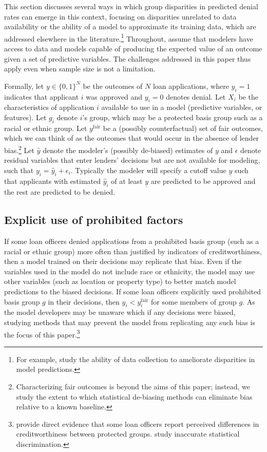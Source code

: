 This section discusses several ways in which group disparities in predicted denial rates can emerge in this context, focusing on disparities unrelated to data availability or the ability of a model to approximate its training data, which are addressed elsewhere in the literature.\footnote{For example,  study the ability of data collection to ameliorate disparities in model predictions.} Throughout, assume that modelers have access to data and models capable of producing the expected value of an outcome given a set of predictive variables. The challenges addressed in this paper thus apply even when sample size is not a limitation.

Formally, let $y\in\{0,1\}^N$ be the outcomes of $N$ loan applications, where $y_i=1$ indicates that applicant $i$ was approved and $y_i=0$ denotes denial. Let $X_i$ be the characteristics of application $i$ available to use in a model (predictive variables, or features). Let $g_i$ denote $i$'s group, which may be a protected basis group such as a racial or ethnic group. Let $y^\text{fair}$ be a (possibly counterfactual) set of fair outcomes, which we can think of as the outcomes that would occur in the absence of lender bias.\footnote{Characterizing fair outcomes is beyond the aims of this paper; instead, we study the extent to which statistical de-biasing methods can eliminate bias relative to a known baseline.} Let $\hat{y}$ denote the modeler's (possibly de-biased) estimates of $y$ and $\epsilon$ denote residual variables that enter lenders' decisions but are not available for modeling, such that $y_i = \hat{y}_i + \epsilon_i$. Typically the modeler will specify a cutoff value $\underline{y}$ such that applicants with estimated $\hat{y}_i$ of at least $\underline{y}$ are predicted to be approved and the rest are predicted to be denied. 

\subsection{Explicit use of prohibited factors}\label{sec:disparatetreatment}
If some loan officers denied applications from a prohibited basis group (such as a racial or ethnic group) more often than justified by indicators of creditworthiness, then a model trained on their decisions may replicate that bias. Even if the variables used in the model do not include race or ethnicity, the model may use other variables (such as location or property type) to better match model predictions to the biased decisions. If some loan officers explicitly used prohibited basis group $g$ in their decisions, then $y_i<y^\text{fair}_i$ for some members of group $g$. As the model developers may be unaware which if any decisions were biased, studying methods that may prevent the model from replicating any such bias is the focus of this paper.\footnote{ provide direct evidence that some loan officers report perceived differences in creditworthiness between protected groups.  study inaccurate statistical discrimination.}

